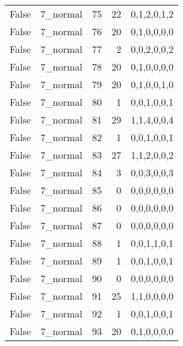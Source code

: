 \begin{tabular}{llrrl}
 False           & 7\_normal            &            75 &                    22 & 0,1,2,0,1,2   \\
 False           & 7\_normal            &            76 &                    20 & 0,1,0,0,0,0   \\
 False           & 7\_normal            &            77 &                     2 & 0,0,2,0,0,2   \\
 False           & 7\_normal            &            78 &                    20 & 0,1,0,0,0,0   \\
 False           & 7\_normal            &            79 &                    20 & 0,1,0,0,1,0   \\
 False           & 7\_normal            &            80 &                     1 & 0,0,1,0,0,1   \\
 False           & 7\_normal            &            81 &                    29 & 1,1,4,0,0,4   \\
 False           & 7\_normal            &            82 &                     1 & 0,0,1,0,0,1   \\
 False           & 7\_normal            &            83 &                    27 & 1,1,2,0,0,2   \\
 False           & 7\_normal            &            84 &                     3 & 0,0,3,0,0,3   \\
 False           & 7\_normal            &            85 &                     0 & 0,0,0,0,0,0   \\
 False           & 7\_normal            &            86 &                     0 & 0,0,0,0,0,0   \\
 False           & 7\_normal            &            87 &                     0 & 0,0,0,0,0,0   \\
 False           & 7\_normal            &            88 &                     1 & 0,0,1,1,0,1   \\
 False           & 7\_normal            &            89 &                     1 & 0,0,1,0,0,1   \\
 False           & 7\_normal            &            90 &                     0 & 0,0,0,0,0,0   \\
 False           & 7\_normal            &            91 &                    25 & 1,1,0,0,0,0   \\
 False           & 7\_normal            &            92 &                     1 & 0,0,1,0,0,1   \\
 False           & 7\_normal            &            93 &                    20 & 0,1,0,0,0,0   \\

\end{tabular}

